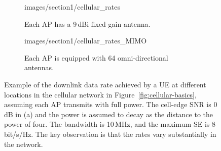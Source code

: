 \begin{figure}[t!]
	\centering 
        \begin{subfigure}[b]{\columnwidth} \centering
	\begin{overpic}[width=.8\columnwidth,tics=10]{images/section1/cellular_rates}
\end{overpic} 
                \caption{Each \gls{AP} has a 9\,dBi fixed-gain antenna.}    \vspace{+2mm}
        \end{subfigure} 
        \begin{subfigure}[b]{\columnwidth} \centering 
	\begin{overpic}[width=.8\columnwidth,tics=10]{images/section1/cellular_rates_MIMO}
\end{overpic} 
                \caption{Each \gls{AP} is equipped with 64 omni-directional antennas.} 
        \end{subfigure} 
	\caption{Example of the downlink data rate achieved by a \gls{UE} at different locations in the cellular network in Figure~\ref{fig:cellular-basics}, assuming each \gls{AP} transmits with full power.
	The cell-edge SNR is 0\,dB in (a) and the power is assumed to decay as the distance to the power of four. The bandwidth is 10\,MHz, and the maximum \gls{SE} is 8\,bit/s/Hz. The key observation is that the rates vary substantially in the network.} 
	\label{fig:cellular-rates} 
\end{figure}

\enlargethispage{\baselineskip} 

